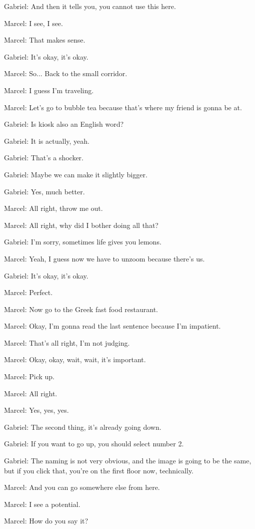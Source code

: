 Gabriel: And then it tells you, you cannot use this here.

Marcel: I see, I see.

Marcel: That makes sense.

Gabriel: It's okay, it's okay.

Marcel: So... Back to the small corridor.

Marcel: I guess I'm traveling.

Marcel: Let's go to bubble tea because that's where my friend is gonna be at.

Gabriel: Is kiosk also an English word?

Gabriel: It is actually, yeah.

Gabriel: That's a shocker.

Gabriel: Maybe we can make it slightly bigger.

Gabriel: Yes, much better.

Marcel: All right, throw me out.

Marcel: All right, why did I bother doing all that?

Gabriel: I'm sorry, sometimes life gives you lemons.

Marcel: Yeah, I guess now we have to unzoom because there's us.

Gabriel: It's okay, it's okay.

Marcel: Perfect.

Marcel: Now go to the Greek fast food restaurant.

Marcel: Okay, I'm gonna read the last sentence because I'm impatient.

Marcel: That's all right, I'm not judging.

Marcel: Okay, okay, wait, wait, it's important.

Marcel: Pick up.

Marcel: All right.

Marcel: Yes, yes, yes.

Gabriel: The second thing, it's already going down.

Gabriel: If you want to go up, you should select number 2.

Gabriel: The naming is not very obvious, and the image is going to be the same, but if you click that, you're on the first floor now, technically.

Marcel: And you can go somewhere else from here.

Marcel: I see a potential.

Marcel: How do you say it?

